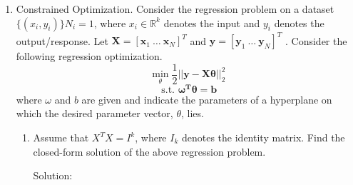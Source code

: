 \documentclass[12pt]{article}
\newcommand{\solu}{{\color{blue} Solution:}}
\begin{document}
\begin{enumerate}
\begin{enumerate}
            \item What would be the solution of the previous part without the naive Bayes assumption?
            
            \solu 
            
            Without Naive Bayes Assumption:\\
            $P(y = 0 | x_1 = 0, x_2 = 1)\\
            =P(y = 0, x_1 = 0, x_2 = 1) / P(x_1 = 0, x_2 = 1)\\
            =\frac{1}{2}$
        \end{enumerate}

        \item Constrained Optimization. Consider the regression problem on a dataset $\{(x_i, y_i)\}N_i=1$, where
        $x_i \in \mathbb{R}^k$ denotes the input and $y_i$ denotes the output/response. Let $\mathbf{X} = [\mathbf{x}_1 \ \dots \ \mathbf{x}_N]^T$ and 
        $\mathbf{y} = [\mathbf{y}_1 \ \dots \ \mathbf{y}_N]^T$ . Consider the following regression optimization.
        $$\min_\theta \frac{1}{2}||\mathbf{y} - \mathbf{X\theta}||^2_2$$
        $$\text{ s.t. } \mathbf{\omega^T\theta} = \mathbf{b}$$
        where $\omega$ and $b$ are given and indicate the parameters of a hyperplane on which the desired parameter vector, $\theta$, lies.
        \begin{enumerate}
            \item Assume that $X^TX = I^k$, where $I_k$ denotes the identity matrix. Find the closed-form solution of the above regression problem.
            
            \solu


\end{enumerate}
\end{enumerate}
\end{document}
